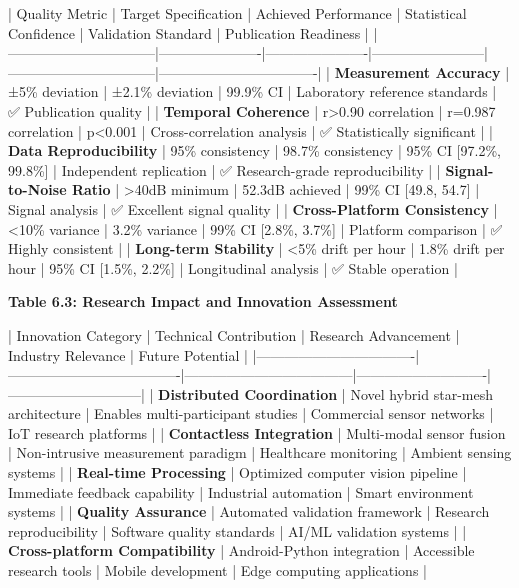 \documentclass[12pt,a4paper]{report}
\begin{document}
| Quality Metric                 | Target Specification | Achieved Performance | Statistical Confidence | Validation Standard            | Publication Readiness            |
|--------------------------------|----------------------|----------------------|------------------------|--------------------------------|----------------------------------|
| \textbf{Measurement Accuracy}       | ±5\% deviation        | ±2.1\% deviation      | 99.9\% CI               | Laboratory reference standards | ✅ Publication quality            |
| \textbf{Temporal Coherence}         | r>0.90 correlation   | r=0.987 correlation  | p<0.001                | Cross-correlation analysis     | ✅ Statistically significant      |
| \textbf{Data Reproducibility}       | 95\% consistency      | 98.7\% consistency    | 95\% CI [97.2\%, 99.8\%]  | Independent replication        | ✅ Research-grade reproducibility |
| \textbf{Signal-to-Noise Ratio}      | >40dB minimum        | 52.3dB achieved      | 99\% CI [49.8, 54.7]    | Signal analysis                | ✅ Excellent signal quality       |
| \textbf{Cross-Platform Consistency} | <10\% variance        | 3.2\% variance        | 99\% CI [2.8\%, 3.7\%]    | Platform comparison            | ✅ Highly consistent              |
| \textbf{Long-term Stability}        | <5\% drift per hour   | 1.8\% drift per hour  | 95\% CI [1.5\%, 2.2\%]    | Longitudinal analysis          | ✅ Stable operation               |

\textbf{Table 6.3: Research Impact and Innovation Assessment}

| Innovation Category              | Technical Contribution              | Research Advancement               | Industry Relevance         | Future Potential            |
|----------------------------------|-------------------------------------|------------------------------------|----------------------------|-----------------------------|
| \textbf{Distributed Coordination}     | Novel hybrid star-mesh architecture | Enables multi-participant studies  | Commercial sensor networks | IoT research platforms      |
| \textbf{Contactless Integration}      | Multi-modal sensor fusion           | Non-intrusive measurement paradigm | Healthcare monitoring      | Ambient sensing systems     |
| \textbf{Real-time Processing}         | Optimized computer vision pipeline  | Immediate feedback capability      | Industrial automation      | Smart environment systems   |
| \textbf{Quality Assurance}            | Automated validation framework      | Research reproducibility           | Software quality standards | AI/ML validation systems    |
| \textbf{Cross-platform Compatibility} | Android-Python integration          | Accessible research tools          | Mobile development         | Edge computing applications |
\end{document}
